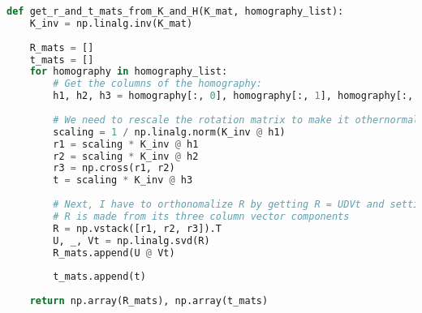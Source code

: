 \documentclass{article}
\begin{document}
\begin{lstlisting}[language=Python]
def get_r_and_t_mats_from_K_and_H(K_mat, homography_list):
    K_inv = np.linalg.inv(K_mat)
    
    R_mats = []
    t_mats = []
    for homography in homography_list:
        # Get the columns of the homography:
        h1, h2, h3 = homography[:, 0], homography[:, 1], homography[:, 2]
            
        # We need to rescale the rotation matrix to make it othernormal:
        scaling = 1 / np.linalg.norm(K_inv @ h1)
        r1 = scaling * K_inv @ h1
        r2 = scaling * K_inv @ h2
        r3 = np.cross(r1, r2)
        t = scaling * K_inv @ h3
        
        # Next, I have to orthonomalize R by getting R = UDVt and setting R to UVt
        # R is made from its three column vector components
        R = np.vstack([r1, r2, r3]).T
        U, _, Vt = np.linalg.svd(R)
        R_mats.append(U @ Vt)
        
        t_mats.append(t)
        
    return np.array(R_mats), np.array(t_mats)
    
\end{lstlisting}
\end{document}
